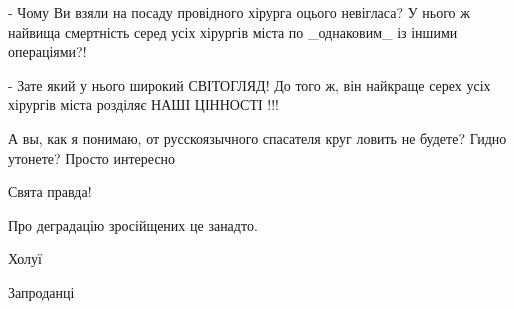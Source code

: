 \begin{itemize}
 

- Чому Ви взяли на посаду провідного хірурга оцього невігласа? У нього ж
найвища смертність серед усіх хірургів міста по _однаковим_ із іншими
операціями?!

- Зате який у нього широкий СВІТОГЛЯД! До того ж, він найкраще серех усіх
хірургів міста розділяє НАШІ ЦІННОСТІ !!!


 

А вы, как я понимаю, от русскоязычного спасателя круг ловить не будете? Гидно утонете? Просто интересно \Smiley[1.0][yellow]

 
Свята правда!

 
Про деградацію зросійщених це занадто.

 
Холуї

 
Запроданці

\end{itemize}


